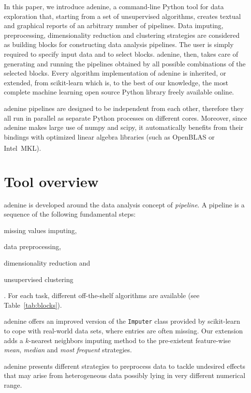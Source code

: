 \documentclass[twoside,11pt]{article}
\makeatletter
\newcommand{\ade}{{\sc adenine}\@\xspace}
\newcommand{\py}{{Python}\@\xspace}
\makeatother
\begin{document}
In this paper, we introduce \ade, a command-line \py tool for data exploration that, starting from a set of unsupervised algorithms, creates textual and graphical reports of an arbitrary number of pipelines. Data imputing, preprocessing, dimensionality reduction and clustering strategies are considered as building blocks for constructing data analysis pipelines. The user is simply required to specify input data and to select blocks. \ade, then, takes care of generating and running the pipelines obtained by all possible combinations of the selected blocks. Every algorithm implementation of \ade is inherited, or extended, from {\sc scikit-learn} \citep{scikit-learn} which is, to the best of our knowledge, the most complete machine learning open source \py library freely available online.

\ade pipelines are designed to be independent from each other, therefore they all run in parallel as separate \py processes on different cores.
Moreover, since \ade makes large use of {\sc numpy} and {\sc scipy}, it automatically benefits from their bindings with optimized linear algebra libraries (such as OpenBLAS or Intel\textsuperscript{\textregistered}~MKL).
\section{Tool overview}\label{sec:implem}
\ade is developed around the data analysis concept of \emph{pipeline}. A pipeline is a sequence of the following fundamental steps:
\begin{enumerate*}[label=(\roman*)]
  \item missing values imputing,
  \item data preprocessing,
  \item dimensionality reduction and
  \item unsupervised clustering
\end{enumerate*}.
For each task, different off-the-shelf algorithms are available (see Table~\ref{tab:blocks}).

\ade offers an improved version of the \texttt{Imputer} class provided by {\sc scikit-learn} to cope with real-world data sets, where entries are often missing. Our extension adds a $k$-nearest neighbors imputing method \citep{troyanskaya2001missing} to the pre-existent feature-wise \emph{mean}, \emph{median} and \emph{most frequent} strategies.

\ade presents different strategies to preprocess data to tackle undesired effects that may arise from heterogeneous data possibly lying in very different numerical range.
\end{document}
